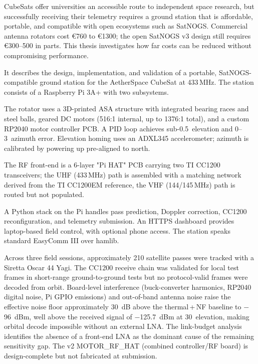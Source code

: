 
CubeSats offer universities an accessible route to independent space research, but successfully receiving their telemetry requires a ground station that is affordable, portable, and compatible with open ecosystems such as SatNOGS. Commercial antenna rotators cost \euro{}760 to \euro{}1300; the open SatNOGS v3 design still requires \euro{}300--500 in parts. This thesis investigates how far costs can be reduced without compromising performance.

It describes the design, implementation, and validation of a portable, SatNOGS-compatible ground station for the AetherSpace CubeSat at 433\,MHz. The station consists of a Raspberry Pi 3A+ with two subsystems.

The rotator uses a 3D-printed ASA structure with integrated bearing races and steel balls, geared DC motors (516:1 internal, up to 1376:1 total), and a custom RP2040 motor controller PCB. A PID loop achieves sub-0.5\degree\ elevation and 0--3\degree\ azimuth error. Elevation homing uses an ADXL345 accelerometer; azimuth is calibrated by powering up pre-aligned to north.

The RF front-end is a 6-layer "Pi HAT" PCB carrying two TI CC1200 transceivers; the UHF (433\,MHz) path is assembled with a matching network derived from the TI CC1200EM reference, the VHF (144/145\,MHz) path is routed but not populated.

A Python stack on the Pi handles pass prediction, Doppler correction, CC1200 reconfiguration, and telemetry submission. An HTTPS dashboard provides laptop-based field control, with optional phone access. The station speaks standard EasyComm III over hamlib.

Across three field sessions, approximately 210 satellite passes were tracked with a Siretta Oscar 44 Yagi. The CC1200 receive chain was validated for local test frames in short-range ground-to-ground tests but no protocol-valid frames were decoded from orbit. Board-level interference (buck-converter harmonics, RP2040 digital noise, Pi GPIO emissions) and out-of-band antenna noise raise the effective noise floor approximately 30~dB above the thermal\,+\,NF baseline to $-$96~dBm, well above the received signal of $-$125.7~dBm at 30\degree\ elevation, making orbital decode impossible without an external LNA. The link-budget analysis identifies the absence of a front-end LNA as the dominant cause of the remaining sensitivity gap. The v2 MOTOR\_RF\_HAT (combined controller/RF board) is design-complete but not fabricated at submission.


